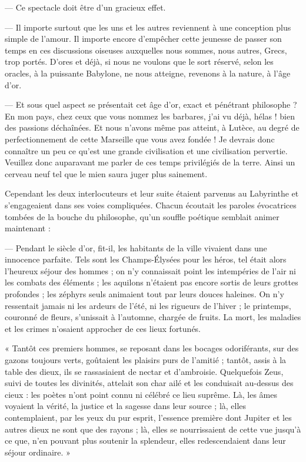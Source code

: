\documentclass[a4paper, 11pt, oneside, polutonikogreek, french]{article}
\begin{document}
--- Ce spectacle doit être d'un gracieux effet.

--- Il importe surtout que les uns et les autres reviennent à une conception plus simple de l'amour. Il importe encore d'empêcher cette jeunesse de passer son temps en ces discussions oiseuses auxquelles nous sommes, nous autres, Grecs, trop portés. D'ores et déjà, si nous ne voulons que le sort réservé, selon les oracles, à la puissante Babylone, ne nous atteigne, revenons à la nature, à l'âge d'or.

\bigskip
\centerline{\EightStarTaper}
\centerline{\EightStarTaper\EightStarTaper}
\bigskip

--- Et sous quel aspect se présentait cet âge d'or, exact et pénétrant philosophe ? En mon pays, chez ceux que vous nommez les barbares, j'ai vu déjà, hélas ! bien des passions déchaînées. Et nous n'avons même pas atteint, à Lutèce, au degré de perfectionnement de cette Marseille que vous avez fondée ! Je devrais donc connaître un peu ce qu'est une grande civilisation et une civilisation pervertie. Veuillez donc auparavant me parler de ces temps privilégiés de la terre. Ainsi un cerveau neuf tel que le mien saura juger plus sainement.

Cependant les deux interlocuteurs et leur suite étaient parvenus au Labyrinthe et s'engageaient dans ses voies compliquées. Chacun écoutait les paroles évocatrices tombées de la bouche du philosophe, qu'un souffle poétique semblait animer maintenant :

--- Pendant le siècle d'or, fit-il, les habitants de la ville vivaient dans une innocence parfaite. Tels sont les Champs-Élysées pour les héros, tel était alors l'heureux séjour des hommes ; on n'y connaissait point les intempéries de l'air ni les combats des éléments ; les aquilons n'étaient pas encore sortis de leurs grottes profondes ; les zéphyrs seuls animaient tout par leurs douces haleines. On n'y ressentait jamais ni les ardeurs de l'été, ni les rigueurs de l'hiver ; le printemps, couronné de fleurs, s'unissait à l'automne, chargée de fruits. La mort, les maladies et les crimes n'osaient approcher de ces lieux fortunés.

« Tantôt ces premiers hommes, se reposant dans les bocages odoriférants, sur des gazons toujours verts, goûtaient les plaisirs purs de l'amitié ; tantôt, assis à la table des dieux, ils se rassasiaient de nectar et d'ambroisie. Quelquefois Zeus, suivi de toutes les divinités, attelait son char ailé et les conduisait au-dessus des cieux : les poètes n'ont point connu ni célébré ce lieu suprême. Là, les âmes voyaient la vérité, la justice et la sagesse dans leur source ; là, elles contemplaient, par les yeux du pur esprit, l'essence première dont Jupiter et les autres dieux ne sont que des rayons ; là, elles se nourrissaient de cette vue jusqu'à ce que, n'en pouvant plus soutenir la splendeur, elles redescendaient dans leur séjour ordinaire. »
\end{document}
